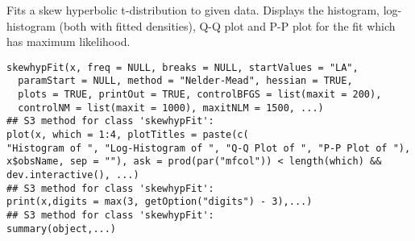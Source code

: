 \begin{Description}\relax
Fits a skew hyperbolic t-distribution to given data.
Displays the histogram, log-histogram (both with fitted densities),
Q-Q plot and P-P plot for the fit which has maximum likelihood.
\end{Description}
\begin{Usage}
\begin{verbatim}
skewhypFit(x, freq = NULL, breaks = NULL, startValues = "LA",
  paramStart = NULL, method = "Nelder-Mead", hessian = TRUE,
  plots = TRUE, printOut = TRUE, controlBFGS = list(maxit = 200),
  controlNM = list(maxit = 1000), maxitNLM = 1500, ...)
## S3 method for class 'skewhypFit':
plot(x, which = 1:4, plotTitles = paste(c(
"Histogram of ", "Log-Histogram of ", "Q-Q Plot of ", "P-P Plot of "),
x$obsName, sep = ""), ask = prod(par("mfcol")) < length(which) &&
dev.interactive(), ...)
## S3 method for class 'skewhypFit':
print(x,digits = max(3, getOption("digits") - 3),...)
## S3 method for class 'skewhypFit':
summary(object,...)
\end{verbatim}
\end{Usage}
